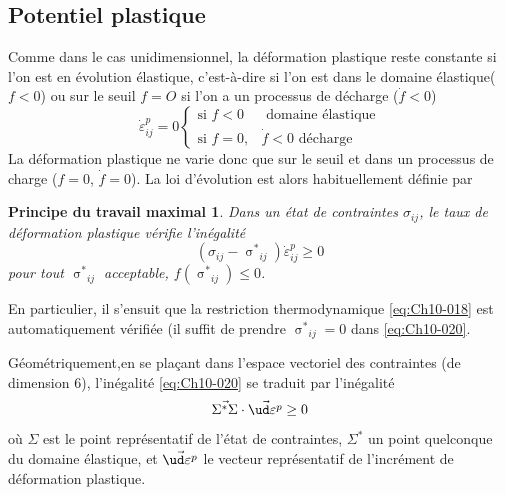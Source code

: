 \subsection{Potentiel plastique} \label{ssec:Ch10-1.3}
Comme dans le cas unidimensionnel, la déformation plastique reste constante si l'on est en évolution élastique, c'est-à-dire si l'on est dans le domaine élastique($f<0$) ou sur le seuil $f=O$ si l'on a un processus de décharge ($\dot{f} < 0$) 
\begin{equation}
    \dot{\varepsilon}_{ij}^p = 0
    \begin{cases}
        \text{si } f < 0 & \text{ domaine élastique} \\
        \text{si } f = 0, & \dot{f}<0 \text{ décharge}
    \end{cases}
    \label{eq:Ch10-019}
\end{equation}
La déformation plastique ne varie donc que sur le seuil et dans un processus de charge ($f=0$, $\dot{f}=0$).
La loi d'évolution est alors habituellement définie par 
\newtheorem*{PTM}{Principe du travail maximal}
\begin{PTM}
    Dans un état de contraintes $\sigma_{ij}$, le taux de 
déformation plastique vérifie l'inégalité 
    \begin{equation}
        \left( \sigma_{ij} - {\mathop{\sigma}^{\ast}}_{ij} \right) \dot{\varepsilon}_{ij}^p \geq 0
        \label{eq:Ch10-020}
    \end{equation}
    pour tout $\displaystyle {\mathop{\sigma}^{\ast}}_{ij}$ acceptable, $\displaystyle f\left( {\mathop{\sigma}^{\ast}}_{ij} \right) \leq 0$.
\end{PTM}

En particulier, il s'ensuit que la restriction thermodynamique \eqref{eq:Ch10-018} est automatiquement vérifiée (il suffit de prendre $\displaystyle {\mathop{\sigma}^{\ast}}_{ij}=0$ dans \eqref{eq:Ch10-020}. 

Géométriquement,en se plaçant dans l'espace vectoriel des contraintes (de dimension 6), l'inégalité \eqref{eq:Ch10-020} se traduit par l'inégalité 
\begin{equation}
    \vec{\Sigma^{\ast} \Sigma} \cdot \vec{\ud \varepsilon^p} \geq 0
    \label{eq:Ch10-021}
\end{equation}
où $\Sigma$ est le point représentatif de l'état de contraintes, $\Sigma^{\ast}$ un point quelconque du domaine élastique, et $\vec{\ud \varepsilon^p}$ le vecteur représentatif de l'incrément de déformation plastique. 

